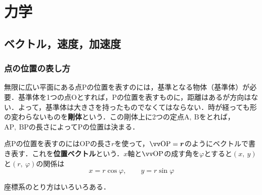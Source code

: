 \chapter{力学}
\setcounter{page}{1}
\section{ベクトル，速度，加速度}
\subsection{点の位置の表し方}

無限に広い平面にある点$\mathrm{P}$の位置を表すのには，基準となる物体（基準体）が必要．基準体を1つの点$\mathrm{O}$とすれば，$\mathrm{P}$の位置を表すものに，距離はあるが方向はない．よって，基準体は大きさを持ったものでなくてはならない．時が経っても形の変わらないものを\textbf{剛体}という．この剛体上に2つの定点$\mathrm{A,\ B}$をとれば，$\mathrm{AP,\ BP}$の長さによって$\mathrm{P}$の位置は決まる．

点$\mathrm{P}$の位置を表すのには$\mathrm{OP}$の長さ$r$を使って，$\vecrm{OP} = \bm{r}$のようにベクトルで書き表す．これを\textbf{位置ベクトル}という．$x$軸と$\vecrm{OP}$の成す角を$\varphi$とすると$(x,\ y)$と$(r,\ \varphi)$の関係は
\begin{equation}
	x = r\cos\varphi, \qquad y = r\sin\varphi
\end{equation}

座標系のとり方はいろいろある．


